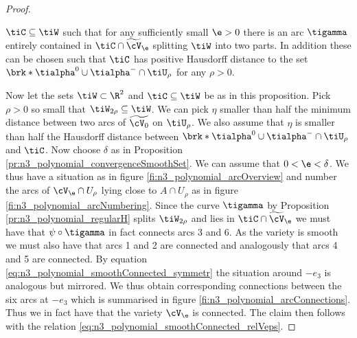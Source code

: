 \begin{proof}
\begin{proposition}
    $\tiC\subseteq \tiW$ such that
    for any sufficiently small $\e>0$ there is an arc $\tigamma$
    entirely contained in $\tiC\cap\widetilde{\cV}_\e$ splitting $\tiW$ into two parts.
    In addition these can be chosen such that $\tiC$ has positive Hausdorff distance to the set
    $\brk*{\tialpha^0\cup\tialpha^-}\cap \tiU_\rho$ for any $\rho>0$.
  \end{proposition}
  Now let the sets $\tiW\subset\R^2$ and $\tiC\subseteq \tiW$ be as in this proposition.
  Pick $\rho>0$ so small that $\tiW_{2\rho}\subseteq \tiW$. 
  We can pick $\eta$ smaller than half the minimum distance between two arcs of $\widetilde{\cV_0}$ on $\tiU_{\rho}$.
  We also assume that $\eta$ is smaller than half the Hausdorff distance between $\brk*{\tialpha^0\cup\tialpha^-}\cap\tiU_\rho$
  and $\tiC$.
  Now choose $\delta$ as in Proposition \ref{pr:n3_polynomial_convergenceSmoothSet}. We can assume that $0<\e<\delta$.
  We thus have a situation as in figure \ref{fi:n3_polynomial_arcOverview}
  and number the arcs of $\cV_\e\cap U_\rho$ lying close to $A\cap U_\rho$ as in figure \ref{fi:n3_polynomial_arcNumbering}.
  Since the curve $\tigamma$ by Proposition \ref{pr:n3_polynomial_regularH} splits $\tiW_{2\rho}$ and lies in $\tiC\cap\widetilde{\cV}_\e$ we must have that
  $\psi\circ\tigamma$ in fact connects arcs 3 and 6.
  As the variety is smooth we must also have that arcs 1 and 2 are connected
  and analogously that arcs 4 and 5 are connected.
  By equation \eqref{eq:n3_polynomial_smoothConnected_symmetr} the situation around $-e_3$ is analogous but mirrored.
  We thus obtain corresponding connections between the six arcs at $-e_3$ which is summarised in figure \ref{fi:n3_polynomial_arcConnections}.
  Thus we in fact have that the variety $\cV_\e$ is connected.
  The claim then follows with the relation \eqref{eq:n3_polynomial_smoothConnected_relVeps}.
\end{proof}

